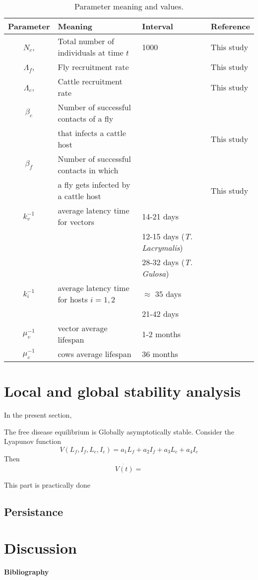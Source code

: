 \documentclass[preprint,12pt]{elsarticle}
\begin{document}
\begin{table*}[htb]\label{Table:Parameters}
	\begin{center}
       
		\begin{tabular}{|c|l|l|l|}
			\hline
			Parameter		&	Meaning & Interval & Reference
			\\
			\hline
			$N_c$,& Total number of individuals at time $t$ &1000&This study
			\\
			$\Lambda_f$,& Fly recruitment rate & & This study
			\\
			$\Lambda_c$,& Cattle recruitment rate & & This study
			\\			
			$\beta_c$& Number of successful contacts of a fly &&
				\\
			& that infects a cattle host &&This study
				\\
			$\beta_f$& Number of successful contacts in which &&
				\\
			& a fly gets infected by a cattle host &&This study
				\\
			$k_v^{-1}$	& average latency time for vectors & 14-21 days &\cite{Otranto:bookchapter}
			\\
				& & 12-15 days (\textit{T. Lacrymalis}) &\cite{Chanie:2014}
			\\
				& & 28-32 days (\textit{T. Gulosa}) &\cite{Chanie:2014}
			\\
			$k_{i}^{-1}$
			&
				average latency time for hosts $i=1,2$ & $\approx$ 35 days& \cite{Otranto:bookchapter}
			\\
			& & 21-42 days& \cite{Chanie:2014}
			\\			
			 $\mu_v^{-1}$	& vector average lifespan &1-2 months&\cite{sanchez:1998}
			\\
			$\mu_c^{-1}$
			&
				cows average lifespan & 36 months& \cite{FAOweb}
			\\
			
			\hline
		\end{tabular}
	\end{center}
	\caption{
		Parameter meaning and values.	}
\end{table*}


\section{Local and global stability analysis}
\noindent In the present section,

\noindent The free disease equilibrium is Globally asymptotically stable.
Consider the Lyapunov function
$$V(L_f,I_f,L_c,I_c)=a_1L_f+a_2I_f+a_3L_c+a_4I_c$$
Then
$$\dot{V(t)}=$$


\noindent This part is practically done
\subsection{Persistance}

\section{Discussion}



\textbf{Bibliography}


\end{document}
